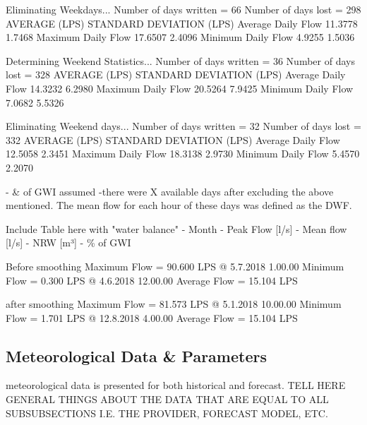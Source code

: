 Eliminating Weekdays...
 Number of days written = 66
 Number of days lost    = 298
                      AVERAGE (LPS)   STANDARD DEVIATION (LPS)
Average Daily Flow      11.3778                  1.7468
Maximum Daily Flow      17.6507                  2.4096
Minimum Daily Flow      4.9255                  1.5036


Determining Weekend Statistics...
 Number of days written = 36
 Number of days lost    = 328
                      AVERAGE (LPS)   STANDARD DEVIATION (LPS)
Average Daily Flow      14.3232                  6.2980
Maximum Daily Flow      20.5264                  7.9425
Minimum Daily Flow      7.0682                  5.5326

Eliminating Weekend days...
 Number of days written = 32
 Number of days lost    = 332
                      AVERAGE (LPS)   STANDARD DEVIATION (LPS)
Average Daily Flow      12.5058                  2.3451
Maximum Daily Flow      18.3138                  2.9730
Minimum Daily Flow      5.4570                  2.2070


- \& of GWI assumed
-there were X available days after excluding the above mentioned. The mean flow for each hour of these days was defined as the DWF.


Include Table here with "water balance" 
- Month - Peak Flow [l/s] - Mean flow [l/s] - NRW [m³] - \% of GWI


Before smoothing
Maximum Flow = 90.600 LPS @ 5.7.2018 1.00.00
Minimum Flow = 0.300 LPS @ 4.6.2018 12.00.00
Average Flow = 15.104 LPS

after smoothing
Maximum Flow = 81.573 LPS @ 5.1.2018 10.00.00
Minimum Flow = 1.701 LPS @ 12.8.2018 4.00.00
Average Flow = 15.104 LPS






\subsection{Meteorological Data \& Parameters} \label{meteodata}

meteorological data is presented for both historical and forecast. 
TELL HERE GENERAL THINGS ABOUT THE DATA THAT ARE EQUAL TO ALL SUBSUBSECTIONS I.E. THE PROVIDER, FORECAST MODEL, ETC. 

    
